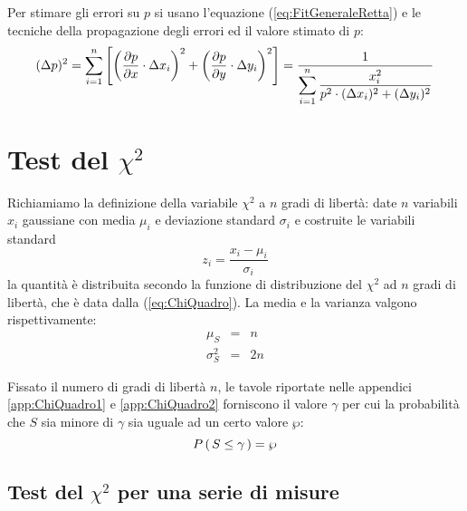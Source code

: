 \begin{exemplify}
{Per stimare gli errori su $p$ si usano l'equazione (\ref{eq:FitGeneraleRetta})
e le tecniche della propagazione degli errori ed il valore stimato di $p$:
$$
(\Delta p)^2=
\dsum{\left[\left(\pfder{p}{x} \cdot \Delta x_i \right)^2+
\left(\pfder{p}{y} \cdot \Delta y_i \right)^2 \right]}{i}{1}{n}
 =\frac{1}{\displaystyle\sum_{i=1}^{n}\frac{x_i^2}{p^2\cdot(\Delta x_i)^2 +
(\Delta y_i)^2}}
$$}

\end{exemplify}


\section{Test del \texorpdfstring{$\chi^2$}{chi2}}
\label{sec:TestChiQuadro}


Richiamiamo la definizione della variabile $\chi^2$ a
$n$ gradi di libert\`a: date $n$ variabili $x_i$ gaussiane con media $\mu_i$ e
deviazione standard $\sigma_i$ e costruite le variabili standard
$$
z_i=\frac{x_i-\mu_i}{\sigma_i}
$$
la quantit\`a
\`e distribuita secondo la funzione di distribuzione del $\chi^2$
ad $n$ gradi di libert\`a, che \`e data dalla (\ref{eq:ChiQuadro}).
La media e la varianza valgono rispettivamente:
\begin{eqnarray*}
\mu_S &=&n\\
\sigma_S^2&=&2n
\end{eqnarray*}

Fissato il numero di gradi di libert\`a $n$, le tavole riportate nelle
appendici \ref{app:ChiQuadro1} e \ref{app:ChiQuadro2} forniscono
il valore $\gamma$ per cui la probabilit\`a che $S$ sia
minore di $\gamma$ sia uguale ad un certo valore $\wp$:
$$
\prob{S\le\gamma} = \wp
$$

\begin{exemplify}


\end{exemplify}


\subsection{Test del \texorpdfstring{$\chi^2$}{chi2} per una serie di misure}

